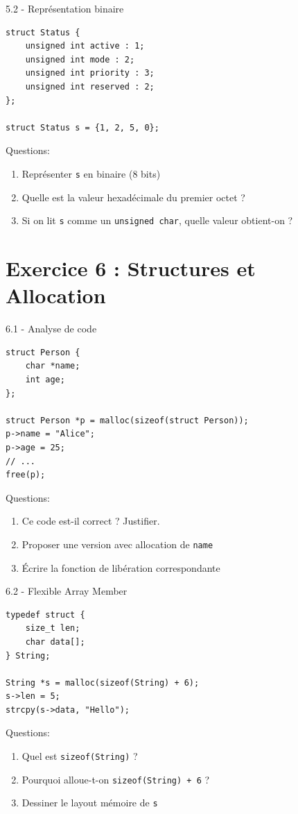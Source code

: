 \documentclass[10pt,a4paper]{article}
\begin{document}
\begin{exercicebox}{5.2 - Représentation binaire}
\begin{lstlisting}
struct Status {
    unsigned int active : 1;
    unsigned int mode : 2;
    unsigned int priority : 3;
    unsigned int reserved : 2;
};

struct Status s = {1, 2, 5, 0};
\end{lstlisting}

Questions:
\begin{enumerate}
\item Représenter \texttt{s} en binaire (8 bits)
\item Quelle est la valeur hexadécimale du premier octet ?
\item Si on lit \texttt{s} comme un \texttt{unsigned char}, quelle valeur obtient-on ?
\end{enumerate}
\end{exercicebox}

\section{Exercice 6 : Structures et Allocation}

\begin{exercicebox}{6.1 - Analyse de code}
\begin{lstlisting}
struct Person {
    char *name;
    int age;
};

struct Person *p = malloc(sizeof(struct Person));
p->name = "Alice";
p->age = 25;
// ...
free(p);
\end{lstlisting}

Questions:
\begin{enumerate}
\item Ce code est-il correct ? Justifier.
\item Proposer une version avec allocation de \texttt{name}
\item Écrire la fonction de libération correspondante
\end{enumerate}
\end{exercicebox}

\begin{exercicebox}{6.2 - Flexible Array Member}
\begin{lstlisting}
typedef struct {
    size_t len;
    char data[];
} String;

String *s = malloc(sizeof(String) + 6);
s->len = 5;
strcpy(s->data, "Hello");
\end{lstlisting}

Questions:
\begin{enumerate}
\item Quel est \texttt{sizeof(String)} ?
\item Pourquoi alloue-t-on \texttt{sizeof(String) + 6} ?
\item Dessiner le layout mémoire de \texttt{s}
\end{enumerate}
\end{exercicebox}
\end{document}

